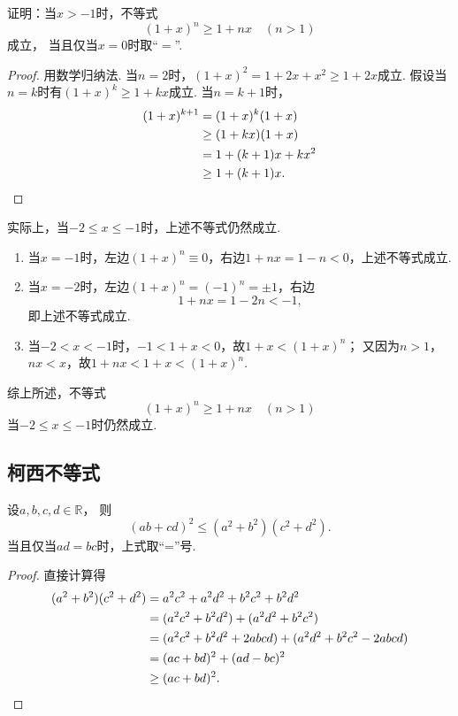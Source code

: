 \begin{example}
证明：当\(x > -1\)时，不等式\begin{equation}
	(1+x)^n \geq 1+nx \quad (n>1)
\end{equation}成立，
当且仅当\(x=0\)时取“\(=\)”.
\begin{proof}
用数学归纳法.
当\(n=2\)时，\((1+x)^2 = 1+2x+x^2 \geq 1+2x\)成立.
假设当\(n=k\)时有\((1+x)^k \geq 1+kx\)成立.
当\(n=k+1\)时，\begin{align*}
	(1+x)^{k+1}
	&= (1+x)^k (1+x) \\
	&\geq (1+kx)(1+x) \\
	&= 1 + (k+1)x + kx^2 \\
	&\geq 1 + (k+1)x.
	\qedhere
\end{align*}
\end{proof}
实际上，当\(-2 \leq x \leq -1\)时，上述不等式仍然成立.

\begin{enumerate}
	\item 当\(x = -1\)时，左边\((1+x)^n \equiv 0\)，右边\(1+nx = 1 - n < 0\)，上述不等式成立.

	\item 当\(x = -2\)时，左边\((1+x)^n = (-1)^n = \pm1\)，右边\[
	1+nx = 1-2n < -1,
	\]即上述不等式成立.

	\item 当\(-2 < x < -1\)时，\(-1 < 1+x < 0\)，故\(1+x < (1+x)^n\)；
	又因为\(n>1\)，\(nx<x\)，故\(1+nx < 1+x < (1+x)^n\).
\end{enumerate}
综上所述，不等式\[
	(1+x)^n \geq 1+nx \quad (n>1)
\]当\(-2 \leq x \leq -1\)时仍然成立.
\end{example}

\subsection{柯西不等式}
\begin{theorem}
设\(a,b,c,d\in\mathbb{R}\)，
则\begin{equation}
	(ab+cd)^2
	\leq
	(a^2+b^2)(c^2+d^2).
\end{equation}
当且仅当\(ad=bc\)时，上式取“=”号.
\begin{proof}
直接计算得\begin{align*}
	(a^2+b^2)(c^2+d^2)
	&= a^2 c^2 + a^2 d^2 + b^2 c^2 + b^2 d^2 \\
	&= (a^2 c^2 + b^2 d^2) + (a^2 d^2 + b^2 c^2) \\
	&= (a^2 c^2 + b^2 d^2 + 2abcd)
	+ (a^2 d^2 + b^2 c^2 - 2abcd) \\
	&= (ac+bd)^2 + (ad-bc)^2 \\
	&\geq (ac+bd)^2.
	\qedhere
\end{align*}
\end{proof}
\end{theorem}

